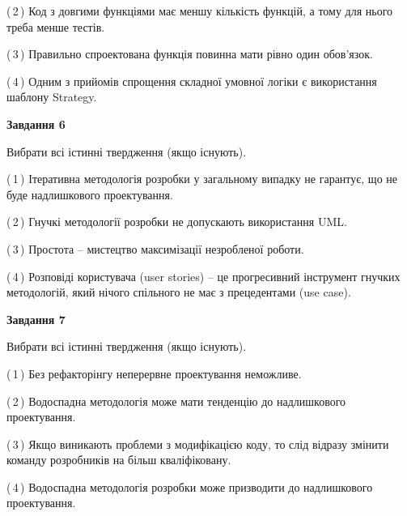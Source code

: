 \documentclass[10pt, ukrainian]{article}
\begin{document}
{\begin {large}
(\,2\,) Код з довгими функціями має меншу кількість функцій, а тому для нього треба менше тестів. %



(\,3\,) Правильно спроектована функція повинна мати рівно один обов'язок. %



(\,4\,) Одним з прийомів спрощення складної умовної логіки є використання шаблону Strategy. %

\newpage

{\begin {center}\textbf{Завдання 6}\end {center}}\par
Вибрати всі істинні твердження (якщо існують).\par
\vspace{2mm}



(\,1\,) Ітеративна методологія розробки у загальному випадку не гарантує, що не буде надлишкового проектування. %



(\,2\,) Гнучкі методології розробки не допускають використання UML. %



(\,3\,) Простота – мистецтво максимізації незробленої роботи. %



(\,4\,) Розповіді користувача (user stories) – це прогресивний інструмент гнучких методологій, який нічого спільного не має з прецедентами (use case). %


{\begin {center}\textbf{Завдання 7}\end {center}}\par
Вибрати всі істинні твердження (якщо існують).\par
\vspace{2mm}



(\,1\,) Без рефакторінгу неперервне проектування неможливе. %



(\,2\,) Водоспадна методологія може мати тенденцію до надлишкового проектування. %



(\,3\,) Якщо виникають проблеми з модифікацією коду, то слід відразу змінити команду розробників на більш кваліфіковану.%



(\,4\,) Водоспадна методологія розробки може призводити до надлишкового проектування. %



\end{large}}
\end{document}
